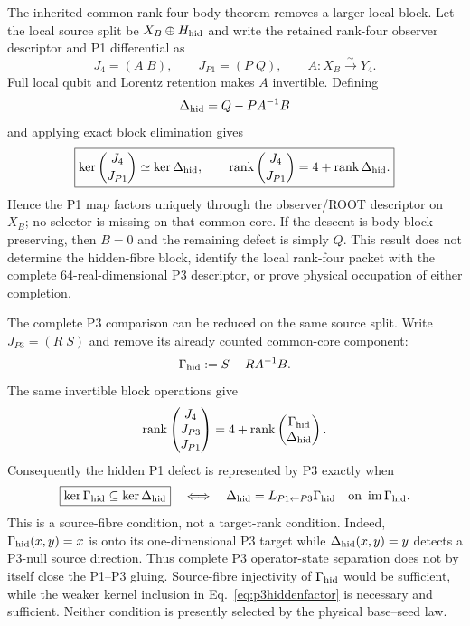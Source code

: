 The inherited common rank-four body theorem removes a larger local block.
Let the local source split be $X_B\oplus H_{\rm hid}$ and write the retained
rank-four observer descriptor and P1 differential as
\begin{equation}
J_4=(A\;B),\qquad J_{P1}=(P\;Q),\qquad A:X_B\overset{\sim}{\longrightarrow}Y_4.
\end{equation}
Full local qubit and Lorentz retention makes $A$ invertible.  Defining
\begin{equation}
\Delta_{\rm hid}=Q-PA^{-1}B
\label{eq:hiddenfiberdefect}
\end{equation}
and applying exact block elimination gives
\begin{equation}
\boxed{
\ker\binom{J_4}{J_{P1}}\simeq\ker\Delta_{\rm hid},\qquad
\operatorname{rank}\binom{J_4}{J_{P1}}
=4+\operatorname{rank}\Delta_{\rm hid}.}
\label{eq:hiddenfiberrank}
\end{equation}
Hence the P1 map factors uniquely through the observer/ROOT descriptor on
$X_B$; no selector is missing on that common core.  If the descent is
body-block preserving, then $B=0$ and the remaining defect is simply $Q$.
This result does not determine the hidden-fibre block, identify the local
rank-four packet with the complete 64-real-dimensional P3 descriptor, or
prove physical occupation of either completion.

The complete P3 comparison can be reduced on the same source split.  Write
$J_{P3}=(R\;S)$ and remove its already counted common-core component:
\begin{equation}
\Gamma_{\rm hid}:=S-RA^{-1}B.
\label{eq:p3hiddenreduction}
\end{equation}
The same invertible block operations give
\begin{equation}
\operatorname{rank}
\begin{pmatrix}J_4\\J_{P3}\\J_{P1}\end{pmatrix}
=4+\operatorname{rank}
\begin{pmatrix}\Gamma_{\rm hid}\\\Delta_{\rm hid}\end{pmatrix}.
\label{eq:p3hiddenrank}
\end{equation}
Consequently the hidden P1 defect is represented by P3 exactly when
\begin{equation}
\boxed{\ker\Gamma_{\rm hid}\subseteq\ker\Delta_{\rm hid}}
\quad\Longleftrightarrow\quad
\Delta_{\rm hid}=L_{P1\leftarrow P3}\Gamma_{\rm hid}
\quad\hbox{on }\operatorname{im}\Gamma_{\rm hid}.
\label{eq:p3hiddenfactor}
\end{equation}
This is a source-fibre condition, not a target-rank condition.  Indeed,
$\Gamma_{\rm hid}(x,y)=x$ is onto its one-dimensional P3 target while
$\Delta_{\rm hid}(x,y)=y$ detects a P3-null source direction.  Thus complete
P3 operator-state separation does not by itself close the P1--P3 gluing.
Source-fibre injectivity of $\Gamma_{\rm hid}$ would be sufficient, while the
weaker kernel inclusion in Eq.~\eqref{eq:p3hiddenfactor} is necessary and
sufficient.  Neither condition is presently selected by the physical
base--seed law.

